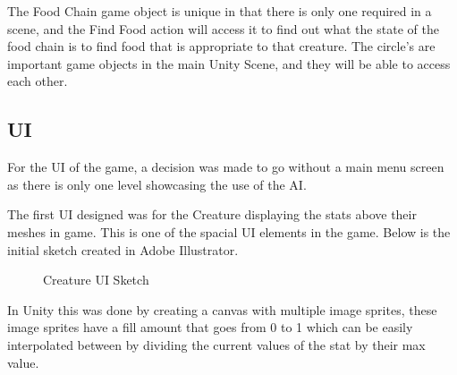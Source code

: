 \documentclass[12pt]{report}
\begin{document}
The Food Chain game object is unique in that there is only one required in a scene, and the Find Food action will access it to find out what the state of the food chain is to find food that is appropriate to that creature. The circle's are important game objects in the main Unity Scene, and they will be able to access each other.

\subsection{UI}
For the UI of the game, a decision was made to go without a main menu screen as there is only one level showcasing the use of the AI. 

The first UI designed was for the Creature displaying the stats above their meshes in game. This is one of the spacial UI elements in the game. Below is the initial sketch created in Adobe Illustrator.

\begin{figure}[H]
    \centering
    \caption{Creature UI Sketch}
\end{figure}

In Unity this was done by creating a canvas with multiple image sprites, these image sprites have a fill amount that goes from 0 to 1 which can be easily interpolated between by dividing the current values of the stat by their max value.
\end{document}
